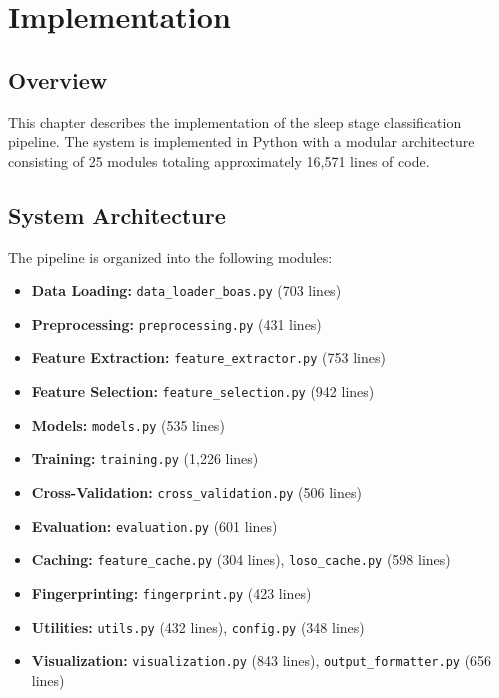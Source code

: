 \chapter{Implementation}
\label{ch:implementation}


\section{Overview}
\label{sec:impl_overview}

This chapter describes the implementation of the sleep stage classification pipeline. The system is implemented in Python with a modular architecture consisting of 25 modules totaling approximately 16,571 lines of code.

\section{System Architecture}
\label{sec:architecture}

The pipeline is organized into the following modules:

\begin{itemize}
    \item \textbf{Data Loading:} \texttt{data\_loader\_boas.py} (703 lines)
    \item \textbf{Preprocessing:} \texttt{preprocessing.py} (431 lines)
    \item \textbf{Feature Extraction:} \texttt{feature\_extractor.py} (753 lines)
    \item \textbf{Feature Selection:} \texttt{feature\_selection.py} (942 lines)
    \item \textbf{Models:} \texttt{models.py} (535 lines)
    \item \textbf{Training:} \texttt{training.py} (1,226 lines)
    \item \textbf{Cross-Validation:} \texttt{cross\_validation.py} (506 lines)
    \item \textbf{Evaluation:} \texttt{evaluation.py} (601 lines)
    \item \textbf{Caching:} \texttt{feature\_cache.py} (304 lines), \texttt{loso\_cache.py} (598 lines)
    \item \textbf{Fingerprinting:} \texttt{fingerprint.py} (423 lines)
    \item \textbf{Utilities:} \texttt{utils.py} (432 lines), \texttt{config.py} (348 lines)
    \item \textbf{Visualization:} \texttt{visualization.py} (843 lines), \texttt{output\_formatter.py} (656 lines)
\end{itemize}

